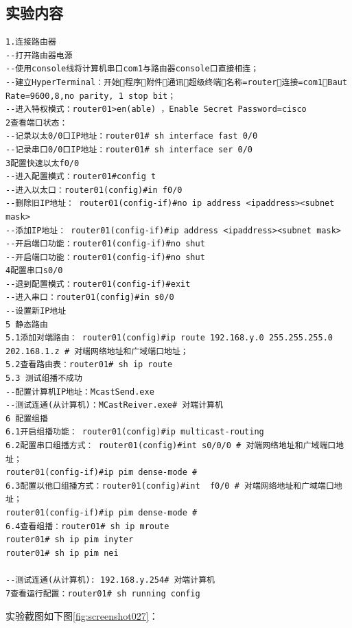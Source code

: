 \documentclass[lang=cn,11pt,a4paper,cite=authoryear]{elegantpaper}
\begin{document}
\subsection{实验内容}

\begin{lstlisting}
1.连接路由器
--打开路由器电源
--使用console线将计算机串口com1与路由器console口直接相连；
--建立HyperTerminal：开始程序附件通讯超级终端名称=router连接=com1Baut Rate=9600,8,no parity, 1 stop bit；
--进入特权模式：router01>en(able) ，Enable Secret Password=cisco
2查看端口状态：
--记录以太0/0口IP地址：router01# sh interface fast 0/0
--记录串口0/0口IP地址：router01# sh interface ser 0/0
3配置快速以太f0/0
--进入配置模式：router01#config t
--进入以太口：router01(config)#in f0/0
--删除旧IP地址： router01(config-if)#no ip address <ipaddress><subnet mask>
--添加IP地址： router01(config-if)#ip address <ipaddress><subnet mask>
--开启端口功能：router01(config-if)#no shut
--开启端口功能：router01(config-if)#no shut
4配置串口s0/0
--退到配置模式：router01(config-if)#exit
--进入串口：router01(config)#in s0/0
--设置新IP地址
5 静态路由
5.1添加对端路由： router01(config)#ip route 192.168.y.0 255.255.255.0 202.168.1.z # 对端网络地址和广域端口地址；
5.2查看路由表：router01# sh ip route
5.3 测试组播不成功
--配置计算机IP地址：McastSend.exe
--测试连通(从计算机)：MCastReiver.exe# 对端计算机
6 配置组播
6.1开启组播功能： router01(config)#ip multicast-routing 
6.2配置串口组播方式： router01(config)#int s0/0/0 # 对端网络地址和广域端口地址；
router01(config-if)#ip pim dense-mode # 
6.3配置以他口组播方式：router01(config)#int  f0/0 # 对端网络地址和广域端口地址；
router01(config-if)#ip pim dense-mode # 
6.4查看组播：router01# sh ip mroute
router01# sh ip pim inyter
router01# sh ip pim nei

--测试连通(从计算机): 192.168.y.254# 对端计算机
7查看运行配置：router01# sh running config

\end{lstlisting}

实验截图如下图\ref{fig:screenshot027}：
\end{document}
